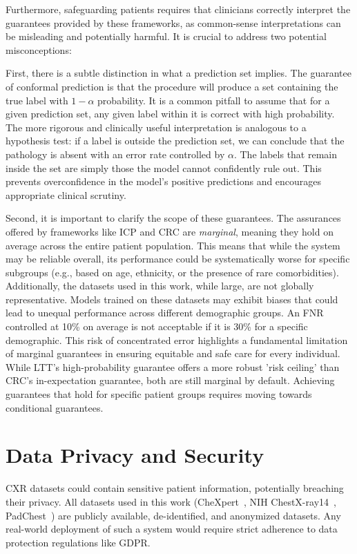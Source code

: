 Furthermore, safeguarding patients requires that clinicians correctly
interpret the guarantees provided by these frameworks,
as common-sense interpretations can be misleading and potentially harmful.
It is crucial to address two potential misconceptions:

First, there is a subtle distinction in what a prediction set implies.
The guarantee of conformal prediction is that the procedure will produce a set
containing the true label with \(1 - \alpha\) probability.
It is a common pitfall to assume that for a given prediction set,
any given label within it is correct with high probability.
The more rigorous and clinically useful interpretation is analogous to a hypothesis test:
if a label is outside the prediction set, we can conclude that the pathology is absent
with an error rate controlled by \(\alpha\).
The labels that remain inside the set are simply those the model cannot confidently rule out.
This prevents overconfidence in the model's positive predictions
and encourages appropriate clinical scrutiny.

Second, it is important to clarify the scope of these guarantees.
The assurances offered by frameworks like ICP and CRC are \emph{marginal},
meaning they hold on average across the entire patient population.
This means that while the system may be reliable overall,
its performance could be systematically worse for specific subgroups
(e.g., based on age, ethnicity, or the presence of rare comorbidities).
Additionally, the datasets used in this work, while large, are not globally representative.
Models trained on these datasets may exhibit biases
that could lead to unequal performance across different demographic groups.
An FNR controlled at 10\% on average is not acceptable
if it is 30\% for a specific demographic.
This risk of concentrated error highlights a fundamental limitation of marginal guarantees
in ensuring equitable and safe care for every individual.
While LTT's high-probability guarantee offers a more robust 'risk ceiling'
than CRC's in-expectation guarantee, both are still marginal by default.
Achieving guarantees that hold for specific patient groups
requires moving towards conditional guarantees.

\section{Data Privacy and Security}

CXR datasets could contain sensitive patient information, potentially breaching their privacy.
All datasets used in this work (CheXpert~\cite{irvin2019chexpert},
NIH ChestX-ray14~\cite{wang2017chestxray}, PadChest~\cite{Bustos2020padchest})
are publicly available, de-identified, and anonymized datasets.
Any real-world deployment of such a system would require strict adherence
to data protection regulations like GDPR.


